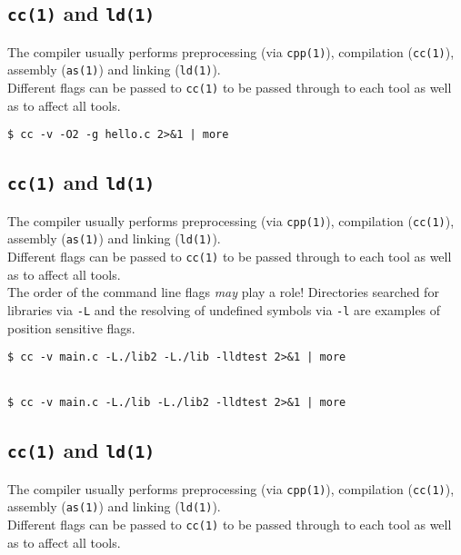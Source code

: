 \documentclass[xga]{xdvislides}
\begin{document}
\subsection{{\tt cc(1)} and {\tt ld(1)}}

The compiler usually performs preprocessing (via {\tt cpp(1)}), compilation
({\tt cc(1)}), assembly ({\tt as(1)}) and linking ({\tt ld(1)}).
\\

Different flags can be passed to {\tt cc(1)} to be passed through to each tool
as well as to affect all tools.  \\

\begin{verbatim}
$ cc -v -O2 -g hello.c 2>&1 | more
\end{verbatim}

\subsection{{\tt cc(1)} and {\tt ld(1)}}

The compiler usually performs preprocessing (via {\tt cpp(1)}), compilation
({\tt cc(1)}), assembly ({\tt as(1)}) and linking ({\tt ld(1)}).
\\

Different flags can be passed to {\tt cc(1)} to be passed through to each tool
as well as to affect all tools.  \\

The order of the command line flags {\em may} play a role!
Directories searched for libraries via {\tt -L} and the resolving of undefined
symbols via {\tt -l} are examples of position sensitive flags.
\\

\begin{verbatim}
$ cc -v main.c -L./lib2 -L./lib -lldtest 2>&1 | more


$ cc -v main.c -L./lib -L./lib2 -lldtest 2>&1 | more
\end{verbatim}


\subsection{{\tt cc(1)} and {\tt ld(1)}}

The compiler usually performs preprocessing (via {\tt cpp(1)}), compilation
({\tt cc(1)}), assembly ({\tt as(1)}) and linking ({\tt ld(1)}).
\\

Different flags can be passed to {\tt cc(1)} to be passed through to each tool
as well as to affect all tools.  \\
\end{document}

